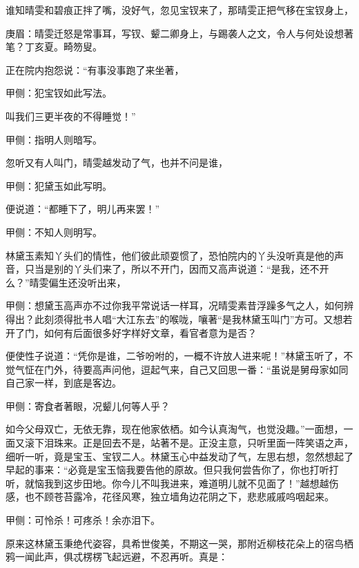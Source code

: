 \begin{parag}
    谁知晴雯和碧痕正拌了嘴，没好气，忽见宝钗来了，那晴雯正把气移在宝钗身上，\begin{note}庚眉：晴雯迁怒是常事耳，写钗、颦二卿身上，与踢袭人之文，令人与何处设想著笔？丁亥夏。畸笏叟。\end{note}正在院内抱怨说：“有事没事跑了来坐著，\begin{note}甲侧：犯宝钗如此写法。\end{note}叫我们三更半夜的不得睡觉！”\begin{note}甲侧：指明人则暗写。\end{note}忽听又有人叫门，晴雯越发动了气，也并不问是谁，\begin{note}甲侧：犯黛玉如此写明。\end{note}便说道：“都睡下了，明儿再来罢！”\begin{note}甲侧：不知人则明写。\end{note}林黛玉素知丫头们的情性，他们彼此顽耍惯了，恐怕院内的丫头没听真是他的声音，只当是别的丫头们来了，所以不开门，因而又高声说道：“是我，还不开么？”晴雯偏生还没听出来，\begin{note}甲侧：想黛玉高声亦不过你我平常说话一样耳，况晴雯素昔浮躁多气之人，如何辨得出？此刻须得批书人唱“大江东去”的喉咙，嚷著“是我林黛玉叫门”方可。又想若开了门，如何有后面很多好字样好文章，看官者意为是否？\end{note}便使性子说道：“凭你是谁，二爷吩咐的，一概不许放人进来呢！”林黛玉听了，不觉气怔在门外，待要高声问他，逗起气来，自己又回思一番：“虽说是舅母家如同自己家一样，到底是客边。\begin{note}甲侧：寄食者著眼，况颦儿何等人乎？\end{note}如今父母双亡，无依无靠，现在他家依栖。如今认真淘气，也觉没趣。”一面想，一面又滚下泪珠来。正是回去不是，站著不是。正没主意，只听里面一阵笑语之声，细听一听，竟是宝玉、宝钗二人。林黛玉心中益发动了气，左思右想，忽然想起了早起的事来：“必竟是宝玉恼我要告他的原故。但只我何尝告你了，你也打听打听，就恼我到这步田地。你今儿不叫我进来，难道明儿就不见面了！”越想越伤感，也不顾苍苔露冷，花径风寒，独立墙角边花阴之下，悲悲戚戚呜咽起来。\begin{note}甲侧：可怜杀！可疼杀！余亦泪下。\end{note}
\end{parag}


\begin{parag}
    原来这林黛玉秉绝代姿容，具希世俊美，不期这一哭，那附近柳枝花朵上的宿鸟栖鸦一闻此声，俱忒楞楞飞起远避，不忍再听。真是：
\end{parag}


